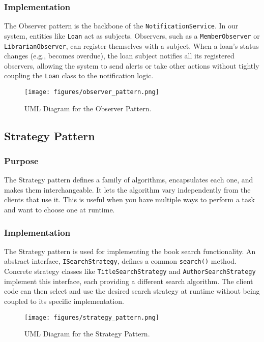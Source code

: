\subsubsection{Implementation}
The Observer pattern is the backbone of the \texttt{NotificationService}. In our system, entities like \texttt{Loan} act as subjects. Observers, such as a \texttt{MemberObserver} or \texttt{LibrarianObserver}, can register themselves with a subject. When a loan's status changes (e.g., becomes overdue), the loan subject notifies all its registered observers, allowing the system to send alerts or take other actions without tightly coupling the \texttt{Loan} class to the notification logic.

\begin{figure}[H]
    \centering
    \texttt{[image: figures/observer\_pattern.png]}
    \caption{UML Diagram for the Observer Pattern.}
    \label{fig:observer_pattern}
\end{figure}

\subsection{Strategy Pattern}
\subsubsection{Purpose}
The Strategy pattern defines a family of algorithms, encapsulates each one, and makes them interchangeable. It lets the algorithm vary independently from the clients that use it. This is useful when you have multiple ways to perform a task and want to choose one at runtime.

\subsubsection{Implementation}
The Strategy pattern is used for implementing the book search functionality. An abstract interface, \texttt{ISearchStrategy}, defines a common \texttt{search()} method. Concrete strategy classes like \texttt{TitleSearchStrategy} and \texttt{AuthorSearchStrategy} implement this interface, each providing a different search algorithm. The client code can then select and use the desired search strategy at runtime without being coupled to its specific implementation.

\begin{figure}[H]
    \centering
    \texttt{[image: figures/strategy\_pattern.png]}
    \caption{UML Diagram for the Strategy Pattern.}
    \label{fig:strategy_pattern}
\end{figure}

